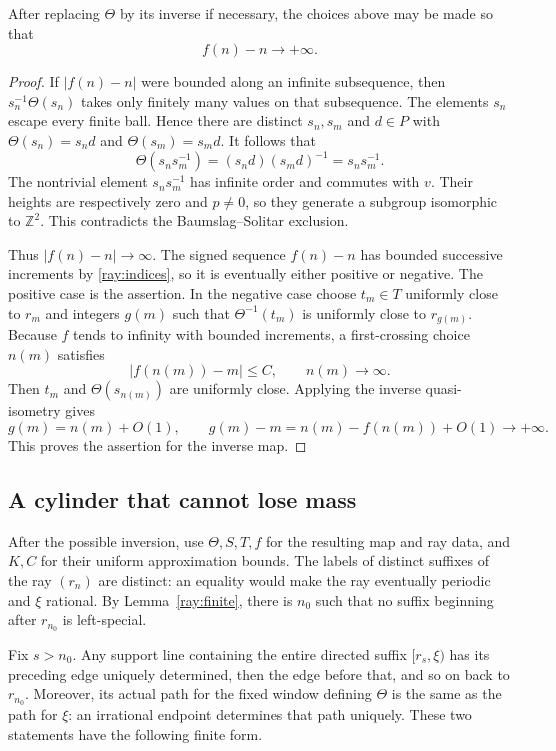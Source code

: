 \begin{lemma}\label{ray:lag}
After replacing $\Theta$ by its inverse if necessary, the choices above
may be made so that
\[
 f(n)-n\longrightarrow+\infty.
\]
\end{lemma}
\begin{proof}
If $|f(n)-n|$ were bounded along an infinite subsequence, then
$s_n^{-1}\Theta(s_n)$ takes only finitely many values on that subsequence.
The elements $s_n$ escape every finite ball. Hence there are distinct
$s_n,s_m$ and $d\in P$ with
$\Theta(s_n)=s_nd$ and $\Theta(s_m)=s_md$. It follows that
\[
 \Theta(s_ns_m^{-1})=(s_nd)(s_md)^{-1}=s_ns_m^{-1}.
\]
The nontrivial element $s_ns_m^{-1}$ has infinite order and commutes
with $v$. Their heights are respectively zero and $p\ne0$, so they
generate a subgroup isomorphic to $\mathbb Z^2$. This contradicts the
Baumslag--Solitar exclusion.

Thus $|f(n)-n|\to\infty$. The signed sequence $f(n)-n$ has bounded
successive increments by \eqref{ray:indices}, so it is eventually
either positive or negative. The positive case is the assertion.
In the negative case choose $t_m\in T$ uniformly close to $r_m$
and integers $g(m)$ such that
$\Theta^{-1}(t_m)$ is uniformly close to $r_{g(m)}$. Because $f$ tends
to infinity with bounded increments, a first-crossing choice $n(m)$
satisfies
\[
 |f(n(m))-m|\leq C,\qquad n(m)\longrightarrow\infty.
\]
Then $t_m$ and $\Theta(s_{n(m)})$ are uniformly close. Applying the
inverse quasi-isometry gives
\[
 g(m)=n(m)+O(1),\qquad
 g(m)-m=n(m)-f(n(m))+O(1)\longrightarrow+\infty.
\]
This proves the assertion for the inverse map.
\end{proof}

\subsection{A cylinder that cannot lose mass}

After the possible inversion, use $\Theta,S,T,f$ for the resulting
map and ray data, and $K,C$ for their uniform approximation bounds.
The labels of distinct suffixes of the ray $(r_n)$ are distinct: an
equality would make the ray eventually periodic and $\xi$ rational.
By Lemma~\ref{ray:finite}, there is $n_0$ such that no suffix beginning
after $r_{n_0}$ is left-special.

Fix $s>n_0$. Any support line containing the entire directed suffix
$[r_s,\xi)$ has its preceding edge uniquely determined, then the edge
before that, and so on back to $r_{n_0}$. Moreover, its actual path for
the fixed window defining $\Theta$ is the same as the path for $\xi$:
an irrational endpoint determines that path uniquely. These two
statements have the following finite form.

